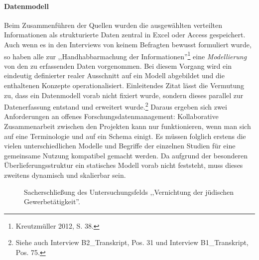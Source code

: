 \paragraph{Datenmodell} Beim Zusammenführen der Quellen wurden die ausgewählten verteilten Informationen als strukturierte Daten zentral in Excel oder Access gespeichert. Auch wenn es in den Interviews von keinem Befragten bewusst formuliert wurde, so haben alle zur ,,Handhabbarmachung der Informationen''\footnote{Kreutzmüller 2012, S. 38.} eine \textit{Modellierung} von den zu erfassenden Daten vorgenommen. Bei diesem Vorgang wird ein eindeutig definierter realer Ausschnitt auf ein Modell abgebildet und die enthaltenen Konzepte operationalisiert. Einleitendes Zitat lässt die Vermutung zu, dass ein Datenmodell vorab nicht fixiert wurde, sondern dieses parallel zur Datenerfassung entstand und erweitert wurde.\footnote{Siehe auch Interview B2\_Transkript, Pos. 31 und Interview B1\_Transkript, Pos. 75.} Daraus ergeben sich zwei Anforderungen an offenes Forschungsdatenmanagement: Kollaborative Zusammenarbeit zwischen den Projekten kann nur funktionieren, wenn man sich auf eine Terminologie und auf ein Schema einigt. Es müssen folglich erstens die vielen unterschiedlichen Modelle und Begriffe der einzelnen Studien für eine gemeinsame Nutzung kompatibel gemacht werden. Da aufgrund der besonderen Überlieferungsstruktur ein statisches Modell vorab nicht feststeht, muss dieses zweitens dynamisch und skalierbar sein.
\begin{figure}[h]
    \centering
    \caption{Sacherschließung des Untersuchungsfelds ,,Vernichtung der jüdischen Gewerbetätigkeit''.}
    \label{fig:x cubed graph}
\end{figure} 
